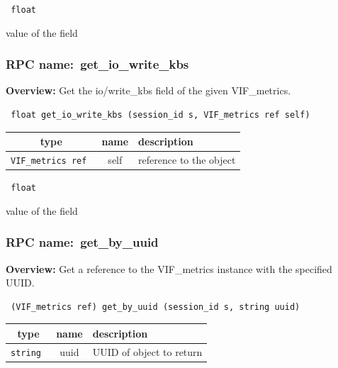 \vspace{0.3cm}

{\tt 
float
}


value of the field
\vspace{0.3cm}
\vspace{0.3cm}
\vspace{0.3cm}
\subsubsection{RPC name:~get\_io\_write\_kbs}

{\bf Overview:} 
Get the io/write\_kbs field of the given VIF\_metrics.

\begin{verbatim} float get_io_write_kbs (session_id s, VIF_metrics ref self)\end{verbatim}



 
\vspace{0.3cm}
\begin{tabular}{|c|c|p{7cm}|}
 \hline
{\bf type} & {\bf name} & {\bf description} \\ \hline
{\tt VIF\_metrics ref } & self & reference to the object \\ \hline 

\end{tabular}

\vspace{0.3cm}

{\tt 
float
}


value of the field
\vspace{0.3cm}
\vspace{0.3cm}
\vspace{0.3cm}
\subsubsection{RPC name:~get\_by\_uuid}

{\bf Overview:} 
Get a reference to the VIF\_metrics instance with the specified UUID.

\begin{verbatim} (VIF_metrics ref) get_by_uuid (session_id s, string uuid)\end{verbatim}



 
\vspace{0.3cm}
\begin{tabular}{|c|c|p{7cm}|}
 \hline
{\bf type} & {\bf name} & {\bf description} \\ \hline
{\tt string } & uuid & UUID of object to return \\ \hline 

\end{tabular}

